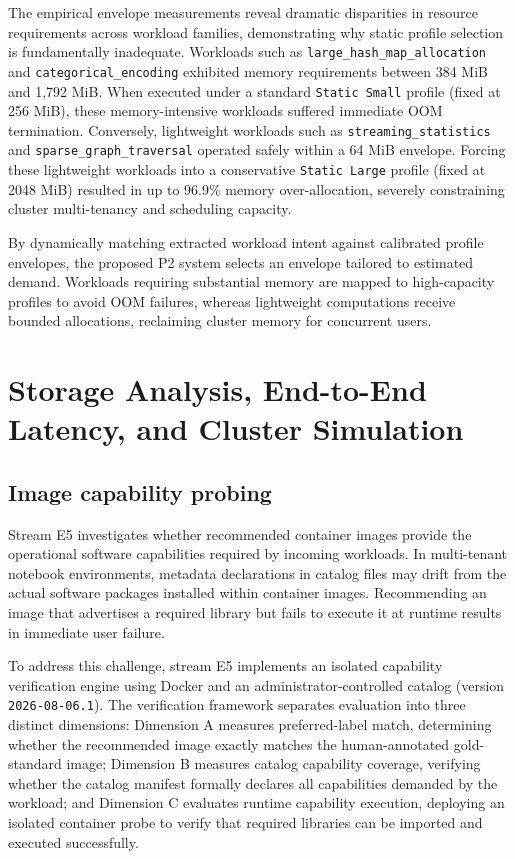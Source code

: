 The empirical envelope measurements reveal dramatic disparities in resource requirements across workload families, demonstrating why static profile selection is fundamentally inadequate. Workloads such as \texttt{large\_hash\_map\_allocation} and \texttt{categorical\_encoding} exhibited memory requirements between 384 MiB and 1,792 MiB. When executed under a standard \texttt{Static Small} profile (fixed at 256 MiB), these memory-intensive workloads suffered immediate OOM termination. Conversely, lightweight workloads such as \texttt{streaming\_statistics} and \texttt{sparse\_graph\_traversal} operated safely within a 64 MiB envelope. Forcing these lightweight workloads into a conservative \texttt{Static Large} profile (fixed at 2048 MiB) resulted in up to 96.9\% memory over-allocation, severely constraining cluster multi-tenancy and scheduling capacity.

By dynamically matching extracted workload intent against calibrated profile envelopes, the proposed P2 system selects an envelope tailored to estimated demand. Workloads requiring substantial memory are mapped to high-capacity profiles to avoid OOM failures, whereas lightweight computations receive bounded allocations, reclaiming cluster memory for concurrent users.

\section{Storage Analysis, End-to-End Latency, and Cluster Simulation}
\label{sec:system_and_cluster_performance}

\subsection{Image capability probing}
\label{subsec:e5_capability_probes}

Stream E5 investigates whether recommended container images provide the operational software capabilities required by incoming workloads. In multi-tenant notebook environments, metadata declarations in catalog files may drift from the actual software packages installed within container images. Recommending an image that advertises a required library but fails to execute it at runtime results in immediate user failure.

To address this challenge, stream E5 implements an isolated capability verification engine using Docker and an administrator-controlled catalog (version \texttt{2026-08-06.1}). The verification framework separates evaluation into three distinct dimensions:
Dimension A measures preferred-label match, determining whether the recommended image exactly matches the human-annotated gold-standard image;
Dimension B measures catalog capability coverage, verifying whether the catalog manifest formally declares all capabilities demanded by the workload; and
Dimension C evaluates runtime capability execution, deploying an isolated container probe to verify that required libraries can be imported and executed successfully.

